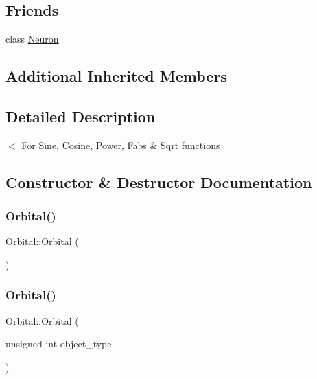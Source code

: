 \subsection*{Friends}
\begin{DoxyCompactItemize}
\item 
class \mbox{\hyperlink{classOrbital_aa410d74ba34b18a9f6bdf24323c4ee5b}{Neuron}}
\end{DoxyCompactItemize}
\subsection*{Additional Inherited Members}


\subsection{Detailed Description}
$<$ For Sine, Cosine, Power, Fabs \& Sqrt functions 

\subsection{Constructor \& Destructor Documentation}
\mbox{\label{classOrbital_ac6f5367141eaa6fb4fa825262da4593a}} 
\subsubsection{\texorpdfstring{Orbital()}{Orbital()}\hspace{0.1cm}{\footnotesize\ttfamily [1/4]}}
{\footnotesize\ttfamily Orbital\+::\+Orbital (\begin{DoxyParamCaption}{ }\end{DoxyParamCaption})\hspace{0.3cm}{\ttfamily [inline]}}

\mbox{\label{classOrbital_a1c7dd9f58b740ce5058ce04aab54292c}} 
\subsubsection{\texorpdfstring{Orbital()}{Orbital()}\hspace{0.1cm}{\footnotesize\ttfamily [2/4]}}
{\footnotesize\ttfamily Orbital\+::\+Orbital (\begin{DoxyParamCaption}\item[{unsigned int}]{object\+\_\+type }\end{DoxyParamCaption})\hspace{0.3cm}{\ttfamily [inline]}}

